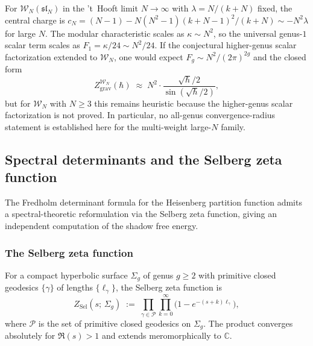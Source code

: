 \begin{remark}
\label{rem:thqg-I-wn-large-n}
For $\mathcal{W}_N(\mathfrak{sl}_N)$ in the 't~Hooft limit $N \to \infty$
with $\lambda = N/(k+N)$ fixed, the central charge is
$c_N = (N-1) - N(N^2-1)(k+N-1)^2/(k+N) \sim -N^2\lambda$ for large $N$. The
modular characteristic scales as $\kappa \sim N^2$, so the universal
genus-$1$ scalar term scales as $F_1=\kappa/24 \sim N^2/24$. If the
conjectural higher-genus scalar factorization extended to
$\mathcal{W}_N$, one would expect
$F_g \sim N^2/(2\pi)^{2g}$ and the closed form
\[
Z_{\mathrm{grav}}^{\mathcal{W}_N}(\hbar) \;\approx\; N^2 \cdot \frac{\sqrt{\hbar}/2}{\sin(\sqrt{\hbar}/2)},
\]
but for $\mathcal{W}_N$ with $N \geq 3$ this remains heuristic because
the higher-genus scalar factorization is not proved. In particular, no
all-genus convergence-radius statement is established here for the
multi-weight large-$N$ family.
\end{remark}



\subsection{Spectral determinants and the Selberg zeta function}
\label{subsec:thqg-I-selberg}

The Fredholm determinant formula for the Heisenberg partition function admits a spectral-theoretic reformulation via the Selberg zeta function, giving an independent computation of the shadow free energy.

\subsubsection{The Selberg zeta function}

\begin{definition}
\label{def:thqg-I-selberg-zeta}
For a compact hyperbolic surface $\Sigma_g$ of genus $g \geq 2$ with primitive closed geodesics $\{\gamma\}$ of lengths $\{\ell_\gamma\}$, the Selberg zeta function is
\begin{equation}\label{eq:thqg-I-selberg-def}
Z_{\mathrm{Sel}}(s;\,\Sigma_g) \;:=\; \prod_{\gamma \in \mathcal{P}} \prod_{k=0}^{\infty} \bigl(1 - e^{-(s+k)\ell_\gamma}\bigr),
\end{equation}
where $\mathcal{P}$ is the set of primitive closed geodesics on $\Sigma_g$. The product converges absolutely for $\Re(s) > 1$ and extends meromorphically to $\mathbb{C}$.
\end{definition}


